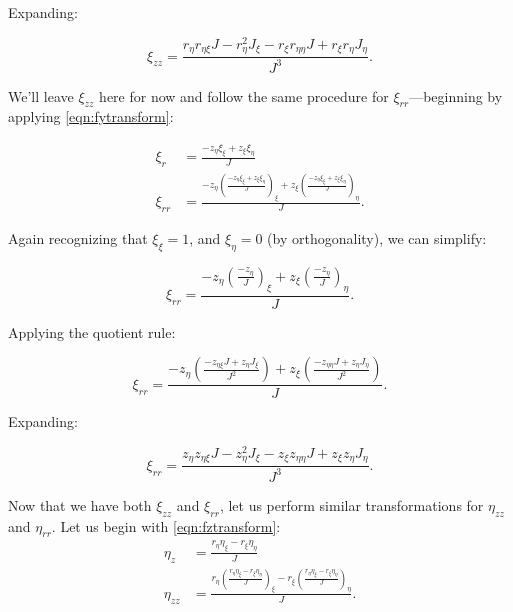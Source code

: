 \noindent Expanding:

\begin{equation}
	\label{eqn:xiz.zpause1}
	\xi_{zz} =  \frac{r_\eta r_{\eta\xi} J -  r_\eta^2 J_\xi -  r_\xi r_{\eta\eta}J + r_\xi r_\eta J_\eta}{J^3}.
\end{equation}

\noindent We'll leave \(\xi_{zz}\) here for now and follow the same procedure for \(\xi_{rr}\)---beginning by applying \cref{eqn:fytransform}:

\begin{align}
	\xi_r &= \frac{-z_\eta \xi_\xi + z_\xi \xi_\eta}{J} \\
	\xi_{rr} &= \frac{-z_\eta \left(\frac{-z_\eta \xi_\xi + z_\xi \xi_\eta}{J}\right)_\xi + z_\xi \left(\frac{-z_\eta \xi_\xi + z_\xi \xi_\eta}{J}\right)_\eta}{J}.
\end{align}

\noindent Again recognizing that \(\xi_\xi = 1\), and \(\xi_\eta = 0\) (by orthogonality), we can simplify:

\begin{equation}
	\xi_{rr} = \frac{-z_\eta \left(\frac{-z_\eta }{J}\right)_\xi + z_\xi \left(\frac{-z_\eta}{J}\right)_\eta}{J}.
\end{equation}

\noindent Applying the quotient rule:


\begin{equation}
	\xi_{rr} = \frac{-z_\eta \left(\frac{-z_{\eta\xi} J + z_\eta J_\xi}{J^2}\right) + z_\xi \left(\frac{-z_{\eta\eta}J + z_\eta J_\eta}{J^2}\right)}{J}.
\end{equation}


\noindent Expanding:

\begin{equation}
	\label{eqn:xirrpause1}
	\xi_{rr} =  \frac{z_\eta z_{\eta\xi} J - z_\eta^2 J_\xi - z_\xi z_{\eta\eta}J + z_\xi z_\eta J_\eta}{J^3}.
\end{equation}


Now that we have both \(\xi_{zz}\) and \(\xi_{rr}\), let us perform similar transformations for \(\eta_{zz}\) and \(\eta_{rr}\).
%
Let us begin with \cref{eqn:fztransform}:
\begin{align}
	\eta_z &= \frac{r_\eta \eta_\xi - r_\xi \eta_\eta}{J} \\
	\eta_{zz} &= \frac{r_\eta \left(\frac{r_\eta \eta_\xi - r_\xi \eta_\eta}{J}\right)_\xi - r_\xi \left(\frac{r_\eta \eta_\xi - r_\xi \eta_\eta}{J}\right)_\eta}{J}.
\end{align}

